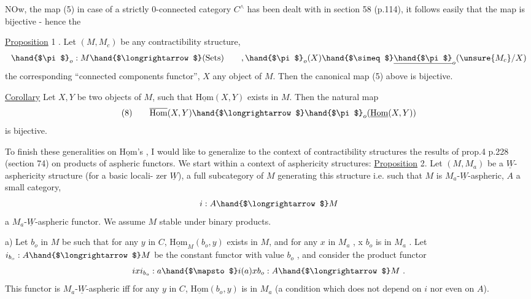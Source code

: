 
 NOw,  the map (5) in case of a strictly  0-connected category
\hand{(}$C^{\wedge}$\hand{)} has been dealt with in section 58 (p.114), it follows easily that the
map is bijective - hence the

\uline{Proposition} 1 . Let $(M,M_c)$ be any contractibility structure, 
\[ \hand{$\pi$}_o : M \hand{$\longrightarrow$} \text{(Sets)} \qquad , \hand{$\pi$}_o(X) \hand{$\simeq$} \underline{\hand{$\pi$}}_o(\unsure{M_c}/X) \] 
the corresponding ``connected components functor'', $X$ any object of $M$. Then
the canonical map (5) above is bijective.

\uline{Corollary} Let $X,Y$ be two objects of $M$, such that $\underline{\mathrm{Hom}}(X,Y)$ exists in $M$.
Then the natural map
\[ (8) \qquad \overline{\mathrm{Hom}}(X,Y) \hand{$\longrightarrow$} \hand{$\pi$}_o(\underline{\mathrm{Hom}}(X,Y)) \]
is bijective. \margin{$\lfloor$\rule{3cm}{0.4pt}}

\margin{$\ulcorner$\rule{3cm}{0.4pt}} To finish these generalities on $\underline{\mathrm{Hom}}$'s , I would like to generalize
to the context of contractibility structures the results of prop.4 p.228
(section 74) on products of aspheric functors. We start within a context
of asphericity structures:
\uline{Proposition} 2. Let $(M,M_a)$ be a $\underline{W}$-asphericity structure (for a basic locali-%
zer $\underline{W}$),  a full subcategory of $M$ generating this structure i.e. such that
 \hand{$\to$} $M$ is $M_a$-$\underline{W}$-aspheric, $A$ a small category,
\[ i: A \hand{$\longrightarrow$} M \]
a  $M_a$-$\underline{W}$-aspheric functor. We assume $M$ stable under binary products.

a) Let $b_o$ in $M$ be such that for any $y$ in $C$, $\underline{\mathrm{Hom}}_M(b_o,y)$ exists in $M$,
and for any $x$ in $M_a$ ,  x $b_o$ is in $M_a$ . Let $i_{b_o} : A \hand{$\longrightarrow$} M$ be the constant
functor with value $b_o$ , and consider the product functor
\[ ixi_{b_o} : a \hand{$\mapsto$} i(a)xb_o : A \hand{$\longrightarrow$} M \ . \]
This functor is $M_a$-$\underline{W}$-aspheric iff for any $y$ in $C$, $\underline{\mathrm{Hom}}(b_o,y)$ is in $M_a$
(a condition which does not depend on $i$ nor even on $A$).

